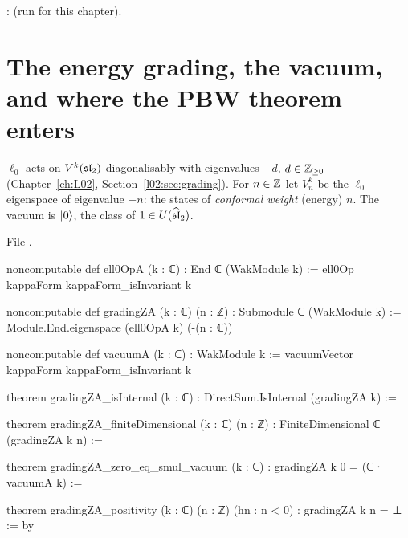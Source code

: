 \begin{status}
\allowbreak{}\allowbreak{}\allowbreak{}: \lean{[propext, Classical.}\allowbreak{}\allowbreak\lean{sound]} (run for this
chapter).
\end{status}

\section{The energy grading, the vacuum, and where the PBW theorem enters}\label{l08:sec:grading}

\begin{definition}\label{l08:def:grading}
$\ell_0$ acts on $V^k(\mathfrak{sl}_2)$ diagonalisably with eigenvalues $-d$, $d\in{\mathbb{Z}}_{\ge0}$
(Chapter~\ref{ch:L02}, Section~\ref{l02:sec:grading}). For $n\in{\mathbb{Z}}$ let $V^k_n$ be the
$\ell_0$-eigenspace of eigenvalue $-n$: the states of \emph{conformal weight} (energy) $n$. The vacuum
is $|0\rangle$, the class of $1\in U(\widehat{\mathfrak{sl}}_2)$.
\end{definition}

\noindent File .
\begin{leancode}
noncomputable def ell0OpA (k : ℂ) : End ℂ (WakModule k) :=
  ell0Op kappaForm kappaForm_isInvariant k

noncomputable def gradingZA (k : ℂ) (n : ℤ) : Submodule ℂ (WakModule k) :=
  Module.End.eigenspace (ell0OpA k) (-(n : ℂ))

noncomputable def vacuumA (k : ℂ) : WakModule k :=
  vacuumVector kappaForm kappaForm_isInvariant k

theorem gradingZA_isInternal (k : ℂ) : DirectSum.IsInternal (gradingZA k) :=

theorem gradingZA_finiteDimensional (k : ℂ) (n : ℤ) :
    FiniteDimensional ℂ (gradingZA k n) :=

theorem gradingZA_zero_eq_smul_vacuum (k : ℂ) :
    gradingZA k 0 = (ℂ ∙ vacuumA k) :=

theorem gradingZA_positivity (k : ℂ) (n : ℤ) (hn : n < 0) : gradingZA k n = ⊥ := by
\end{leancode}

